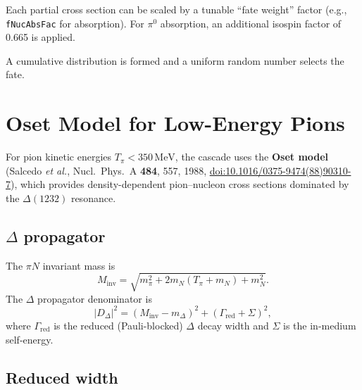 \documentclass[11pt,a4paper]{article}
\newcommand{\unit}[1]{\,\mathrm{#1}}
\newcommand{\MeV}{\unit{MeV}}
\begin{document}
Each partial cross section can be scaled by a tunable
``fate weight'' factor (e.g., \texttt{fNucAbsFac} for absorption).
For $\pi^{0}$ absorption, an additional isospin factor of 0.665 is
applied.

A cumulative distribution is formed and a uniform random number selects
the fate.

\section{Oset Model for Low-Energy Pions}
\label{sec:oset}

For pion kinetic energies $T_{\pi} < 350\MeV$, the cascade uses the
\textbf{Oset model} (Salcedo \textit{et al.}, Nucl.\ Phys.\ A
\textbf{484}, 557, 1988, \href{https://doi.org/10.1016/0375-9474(88)90310-7}{doi:10.1016/0375-9474(88)90310-7}), which provides density-dependent pion--nucleon
cross sections dominated by the $\Delta(1232)$ resonance.

\subsection{$\Delta$ propagator}

The $\pi N$ invariant mass is
\begin{equation}
  M_{\text{inv}} = \sqrt{m_{\pi}^{2} + 2m_{N}(T_{\pi} + m_{N}) + m_{N}^{2}}.
\end{equation}
The $\Delta$ propagator denominator is
\begin{equation}
  |D_{\Delta}|^{2}
  = (M_{\text{inv}} - m_{\Delta})^{2} + (\Gamma_{\text{red}} + \Sigma)^{2},
\end{equation}
where $\Gamma_{\text{red}}$ is the reduced (Pauli-blocked) $\Delta$ decay
width and $\Sigma$ is the in-medium self-energy.

\subsection{Reduced width}
\end{document}
